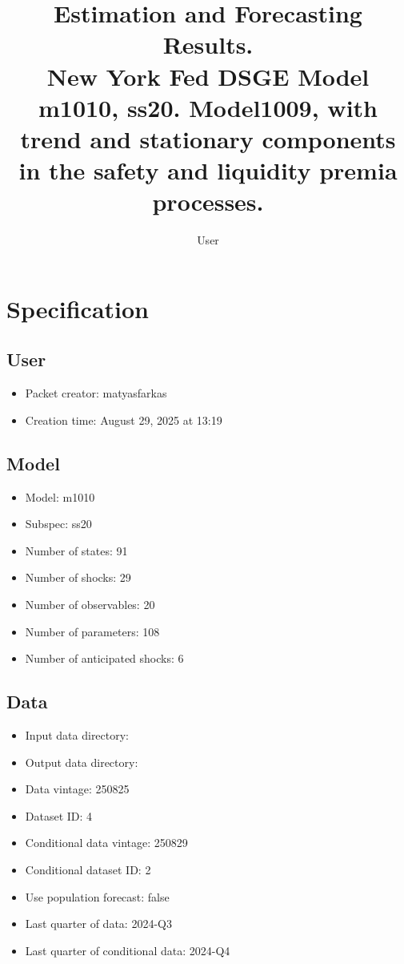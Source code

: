 \documentclass{article}
\title{Estimation and Forecasting Results. \\ New York Fed DSGE Model m1010, ss20. Model1009, with trend and stationary components in the safety and liquidity premia processes.}
\author{User}
\begin{document}
\maketitle


\section{Specification}

\subsection{User}

\begin{itemize}
  \item Packet creator: matyasfarkas
  \item Creation time: August 29, 2025 at 13:19
\end{itemize}

\subsection{Model}

\begin{itemize}
  \item Model: m1010
  \item Subspec: ss20
  \item Number of states: 91
  \item Number of shocks: 29
  \item Number of observables: 20
  \item Number of parameters: 108
  \item Number of anticipated shocks: 6
\end{itemize}

\subsection{Data}

\begin{itemize}
  \item Input data directory: 
  \item Output data directory: 
  \item Data vintage: 250825
  \item Dataset ID: 4
  \item Conditional data vintage: 250829
  \item Conditional dataset ID: 2
  \item Use population forecast: false
  \item Last quarter of data: 2024-Q3
  \item Last quarter of conditional data: 2024-Q4
\end{itemize}
\end{document}
